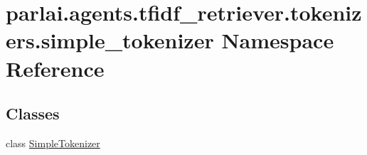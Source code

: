 \hypertarget{namespaceparlai_1_1agents_1_1tfidf__retriever_1_1tokenizers_1_1simple__tokenizer}{}\section{parlai.\+agents.\+tfidf\+\_\+retriever.\+tokenizers.\+simple\+\_\+tokenizer Namespace Reference}
\label{namespaceparlai_1_1agents_1_1tfidf__retriever_1_1tokenizers_1_1simple__tokenizer}
\subsection*{Classes}
\begin{DoxyCompactItemize}
\item 
class \hyperlink{classparlai_1_1agents_1_1tfidf__retriever_1_1tokenizers_1_1simple__tokenizer_1_1SimpleTokenizer}{Simple\+Tokenizer}
\end{DoxyCompactItemize}
